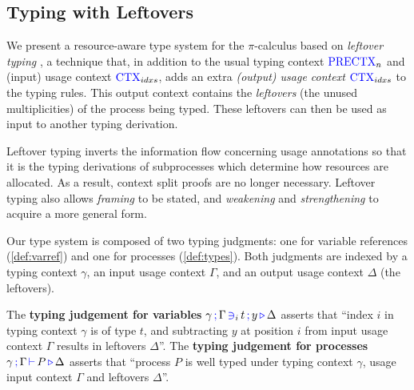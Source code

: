 \documentclass[]{llncs}
\newcommand{\picalc}{$\pi$-calculus}
\newcommand{\type}[1]{\textcolor{blue}{\operatorname{#1}}}
\newcommand{\types}[4]{#1 \, \type{;} \, #2 \, \type{\vdash} \, #3 \, \type{\triangleright} \, #4}
\newcommand{\contains}[6]{#1 \, \type{;} \, #2 \, \type{\ni}_{#3} \, #4 \, \type{;} \, #5 \, \type{\triangleright} \, #6}
\newcommand{\PreCtx}{\type{PRECTX}}
\newcommand{\Ctx}{\type{CTX}}
\begin{document}
\subsection{Typing with Leftovers}
\label{leftover-typing}

We present a resource-aware type system for the \picalc{} based on \emph{leftover typing} \cite{Allais2018a}, a technique that, in addition to the usual typing context $\PreCtx_n$ and (input) usage context $\Ctx_{idxs}$, adds an extra \emph{(output) usage context} $\Ctx_{idxs}$ to the typing rules.
This output context contains the \emph{leftovers} (the unused multiplicities) of the process being typed.
These leftovers can then be used as input to another typing derivation.

Leftover typing inverts the information flow concerning usage annotations so that it is the typing derivations of subprocesses which determine how resources are allocated.
As a result, context split proofs are no longer necessary.
Leftover typing also allows \emph{framing} to be stated, and \emph{weakening} and \emph{strengthening} to acquire a more general form.

Our type system is composed of two typing judgments: one for variable references (\autoref{def:varref}) and one for processes (\autoref{def:types}).
Both judgments are indexed by a typing context $\gamma$, an input usage context $\Gamma$, and an output usage context $\Delta$ (the leftovers).

The \textbf{typing judgement for variables} $\contains{\gamma}{\Gamma}{i}{t}{y}{\Delta}$ asserts that ``index $i$ in typing context $\gamma$ is of type $t$, and subtracting $y$ at position $i$ from input usage context $\Gamma$ results in leftovers $\Delta$''.
The \textbf{typing judgement for processes} $\types{\gamma}{\Gamma}{P}{\Delta}$ asserts that ``process $P$ is well typed under typing context $\gamma$, usage input context $\Gamma$ and leftovers $\Delta$''.
\end{document}
